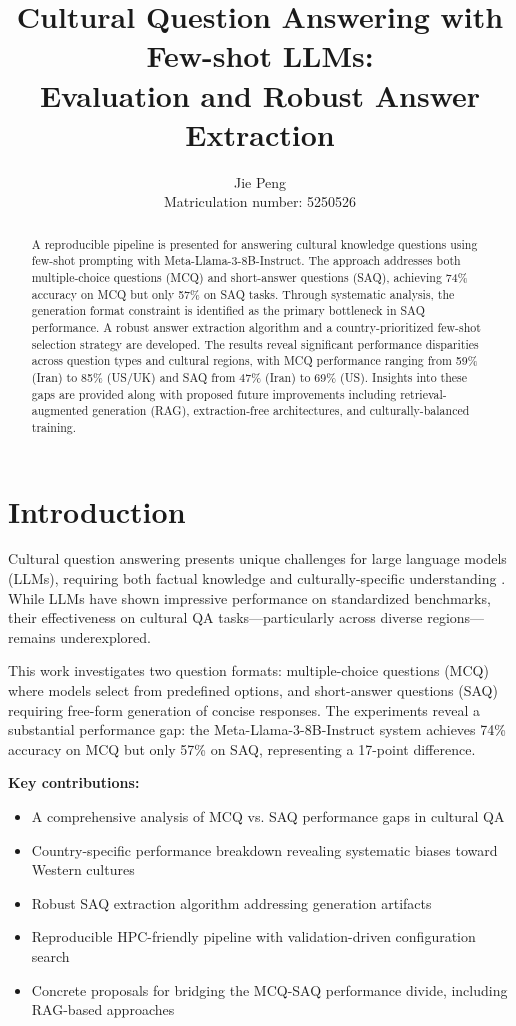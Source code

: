 \documentclass[11pt,a4paper,twocolumn]{article}
\title{\textbf{Cultural Question Answering with Few-shot LLMs:\\ Evaluation and Robust Answer Extraction}}
\author{
  Jie Peng \\
  Matriculation number: 5250526\\
  }
\date{}
\begin{document}
\maketitle

\begin{abstract}
A reproducible pipeline is presented for answering cultural knowledge questions using few-shot prompting with Meta-Llama-3-8B-Instruct. The approach addresses both multiple-choice questions (MCQ) and short-answer questions (SAQ), achieving 74\% accuracy on MCQ but only 57\% on SAQ tasks. Through systematic analysis, the generation format constraint is identified as the primary bottleneck in SAQ performance. A robust answer extraction algorithm and a country-prioritized few-shot selection strategy are developed. The results reveal significant performance disparities across question types and cultural regions, with MCQ performance ranging from 59\% (Iran) to 85\% (US/UK) and SAQ from 47\% (Iran) to 69\% (US). Insights into these gaps are provided along with proposed future improvements including retrieval-augmented generation (RAG), extraction-free architectures, and culturally-balanced training.
\end{abstract}

\section{Introduction}

Cultural question answering presents unique challenges for large language models (LLMs), requiring both factual knowledge and culturally-specific understanding \cite{brown2020language}. While LLMs have shown impressive performance on standardized benchmarks, their effectiveness on cultural QA tasks—particularly across diverse regions—remains underexplored.

This work investigates two question formats: multiple-choice questions (MCQ) where models select from predefined options, and short-answer questions (SAQ) requiring free-form generation of concise responses. The experiments reveal a substantial performance gap: the Meta-Llama-3-8B-Instruct system achieves 74\% accuracy on MCQ but only 57\% on SAQ, representing a 17-point difference.

\textbf{Key contributions:}
\begin{itemize}
\item A comprehensive analysis of MCQ vs. SAQ performance gaps in cultural QA
\item Country-specific performance breakdown revealing systematic biases toward Western cultures
\item Robust SAQ extraction algorithm addressing generation artifacts
\item Reproducible HPC-friendly pipeline with validation-driven configuration search
\item Concrete proposals for bridging the MCQ-SAQ performance divide, including RAG-based approaches
\end{itemize}
\end{document}
